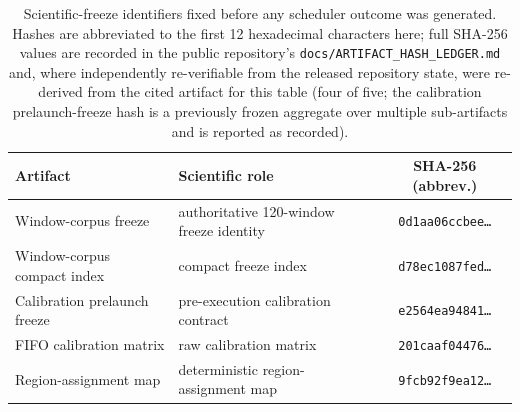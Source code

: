 \begin{table}[t]
\centering
\caption{Scientific-freeze identifiers fixed before any scheduler outcome
was generated. Hashes are abbreviated to the first 12 hexadecimal
characters here; full SHA-256 values are recorded in the public
repository's \texttt{docs/ARTIFACT\_HASH\_LEDGER.md} and, where independently re-verifiable
from the released repository state, were re-derived from the cited
artifact for this table (four of five; the calibration prelaunch-freeze
hash is a previously frozen aggregate over multiple sub-artifacts and is
reported as recorded).}
\label{tab:hashes}
\begin{tabular}{llc}
\toprule
Artifact & Scientific role & SHA-256 (abbrev.) \\
\midrule
Window-corpus freeze & authoritative 120-window freeze identity & \texttt{0d1aa06ccbee\ldots} \\
Window-corpus compact index & compact freeze index & \texttt{d78ec1087fed\ldots} \\
Calibration prelaunch freeze & pre-execution calibration contract & \texttt{e2564ea94841\ldots} \\
FIFO calibration matrix & raw calibration matrix & \texttt{201caaf04476\ldots} \\
Region-assignment map & deterministic region-assignment map & \texttt{9fcb92f9ea12\ldots} \\
\bottomrule
\end{tabular}
\end{table}
